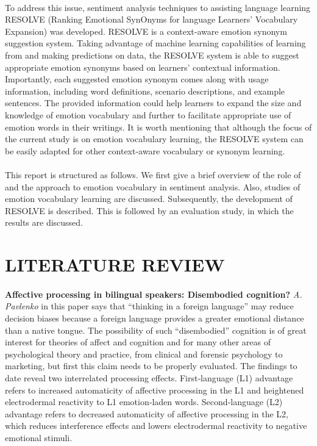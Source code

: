 \documentclass[a4paper,12pt,oneside]{article}
\begin{document}
\paragraph{}
To address this issue, sentiment analysis techniques to assisting language learning RESOLVE (Ranking Emotional SynOnyms for language Learners’ Vocabulary Expansion) was developed. RESOLVE is a context-aware emotion synonym suggestion system. Taking advantage of machine learning capabilities of learning from and making predictions on data, the RESOLVE system is able to suggest appropriate emotion synonyms based on learners’ contextual information. Importantly, each suggested emotion synonym comes along with usage information, including word definitions, scenario descriptions, and example sentences. The provided information could help learners to expand the size and knowledge of emotion vocabulary and further to facilitate appropriate use of emotion words in their writings. It is worth mentioning that although the focus of the current study is on emotion vocabulary learning, the RESOLVE system can be easily adapted for other context-aware vocabulary or synonym learning. 
\paragraph{}
This report is structured as follows. We first give a brief overview of the role of and the approach to emotion vocabulary in sentiment analysis. Also, studies of emotion vocabulary learning are discussed. Subsequently, the development of RESOLVE is described. This is followed by an evaluation study, in which the results are discussed. 


\newpage
\section{LITERATURE REVIEW}
\paragraph{}
\textbf{Affective processing in bilingual speakers: Disembodied cognition?} 
\textit{A. Pavlenko} in this paper says that
“thinking in a foreign language” may reduce decision biases because a foreign language provides a greater emotional distance than a native tongue. The possibility of such “disembodied” cognition is of great interest for theories of affect and cognition and for many other areas of psychological theory and practice, from clinical and forensic psychology to marketing, but first this claim needs to be properly evaluated. The findings to date reveal two interrelated processing effects. First‐language (L1) advantage refers to increased automaticity of affective processing in the L1 and heightened electrodermal reactivity to L1 emotion‐laden words. Second‐language (L2) advantage refers to decreased automaticity of affective processing in the L2, which reduces interference effects and lowers electrodermal reactivity to negative emotional stimuli. 
\end{document}
